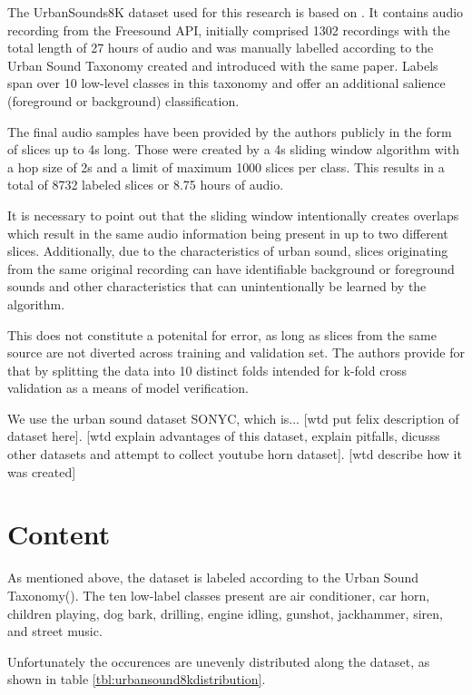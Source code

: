The UrbanSounds8K dataset used for this research is based on \cite{Salamon:UrbanSound:ACMMM:14}. It contains audio recording from the Freesound API, initially comprised 1302 recordings with the total length of 27 hours of audio and was manually labelled according to the Urban Sound Taxonomy created and introduced with the same paper. Labels span over 10 low-level classes in this taxonomy and offer an additional salience (foreground or background) classification.

The final audio samples have been provided by the authors publicly in the form of slices up to 4s long. Those were created by a 4s sliding window algorithm with a hop size of 2s and a limit of maximum 1000 slices per class. This results in a total of 8732 labeled slices or 8.75 hours of audio.

It is necessary to point out that the sliding window intentionally creates overlaps which result in the same audio information being present in up to two different slices. Additionally, due to the characteristics of urban sound, slices originating from the same original recording can have identifiable background or foreground sounds and other characteristics that can unintentionally be learned by the algorithm. %

 This does not constitute a potenital for error, as long as 
  slices from the same source are not diverted across training and validation set. The authors provide for that by splitting the data into 10 distinct folds intended for k-fold cross validation as a means of model verification.


We use the urban sound dataset SONYC, which is... [wtd put felix description of dataset here]. [wtd explain advantages of this dataset, explain pitfalls, dicusss other datasets and attempt to collect youtube horn dataset].  [wtd describe how it was created]

\section{Content}

As mentioned above, the dataset is labeled according to the Urban Sound Taxonomy(\cite{Salamon:UrbanSound:ACMMM:14}). The ten low-label classes present are air conditioner, car horn, children playing, dog bark, drilling, engine idling, gunshot, jackhammer, siren, and street music.

Unfortunately the occurences are unevenly distributed along the dataset, as shown in table \ref{tbl:urbansound8kdistribution}. 

